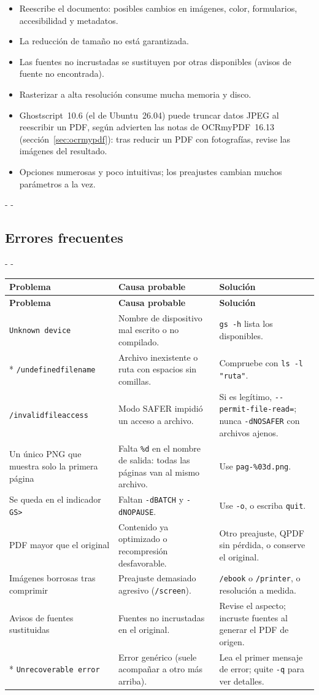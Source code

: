 \documentclass[11pt,a4paper]{article}
\makeatletter
\newcommand{\necesitaespacio}[1]{\par\penalty-100\begingroup
	\setlength{\dimen@}{#1}\dimen@ii\pagegoal\advance\dimen@ii-\pagetotal
	\ifdim\dimen@>\dimen@ii\ifdim\dimen@ii>\z@\vfil\fi\penalty-\@M\fi\endgroup}
\newenvironment{errores}{%
	\par\begingroup\small
	\begin{longtable}{L{4.1cm}L{4.9cm}L{6.0cm}}
		\toprule\rowcolor{tablacab}\cab{Problema} & \cab{Causa probable} & \cab{Solución} \\ \midrule
		\endfirsthead
		\toprule\rowcolor{tablacab}\cab{Problema} & \cab{Causa probable} & \cab{Solución} \\ \midrule
		\endhead
		\bottomrule
		\endfoot}
	{\end{longtable}\endgroup}
\newcommand{\cmd}[1]{\texttt{\textcolor{colcmd}{#1}}}      %
\newcommand{\opt}[1]{\texttt{\textcolor{colopt}{#1}}}      %
\newcommand{\arch}[1]{\texttt{\textcolor{colarch}{#1}}}    %
\newcommand{\val}[1]{\texttt{#1}}                          %
\newcommand{\cab}[1]{\textbf{#1}}
\makeatother
\begin{document}
	\begin{limitacion}
		\begin{itemize}
			\item Reescribe el documento: posibles cambios en imágenes, color, formularios, accesibilidad y metadatos.
			\item La reducción de tamaño no está garantizada.
			\item Las fuentes no incrustadas se sustituyen por otras disponibles (avisos de fuente no encontrada).
			\item Rasterizar a alta resolución consume mucha memoria y disco.
			\item Ghostscript~10.6 (el de Ubuntu~26.04) puede truncar datos JPEG al reescribir un PDF, según advierten las notas de OCRmyPDF~16.13 (sección~\ref{sec:ocrmypdf}): tras reducir un PDF con fotografías, revise las imágenes del resultado.
			\item Opciones numerosas y poco intuitivas; los preajustes cambian muchos parámetros a la vez.
		\end{itemize}
	\end{limitacion}
	
	\necesitaespacio{14\baselineskip}
	\subsection{Errores frecuentes}
	
	\necesitaespacio{10\baselineskip}
	\begin{errores}
		\texttt{Unknown device} & Nombre de dispositivo mal escrito o no compilado. & \cmd{gs -h} lista los disponibles.\\*
		\texttt{/\allowbreak{}undefinedfilename} & Archivo inexistente o ruta con espacios sin comillas. & Compruebe con \cmd{ls -l "ruta"}.\\
		\texttt{/\allowbreak{}invalidfileaccess} & Modo SAFER impidió un acceso a archivo. & Si es legítimo, \opt{-{}-permit-\allowbreak{}file-\allowbreak{}read=}; nunca \opt{-dNOSAFER} con archivos ajenos.\\
		Un único PNG que muestra solo la primera página & Falta \val{\%d} en el nombre de salida: todas las páginas van al mismo archivo. & Use \arch{pag-\%03d.png}.\\
		Se queda en el indicador \texttt{GS>} & Faltan \opt{-dBATCH} y \opt{-dNOPAUSE}. & Use \opt{-o}, o escriba \texttt{quit}.\\
		PDF mayor que el original & Contenido ya optimizado o recompresión desfavorable. & Otro preajuste, QPDF sin pérdida, o conserve el original.\\
		Imágenes borrosas tras comprimir & Preajuste demasiado agresivo (\val{/screen}). & \val{/ebook} o \val{/printer}, o resolución a medida.\\
		Avisos de fuentes sustituidas & Fuentes no incrustadas en el original. & Revise el aspecto; incruste fuentes al generar el PDF de origen.\\*
		\texttt{Unrecoverable error} & Error genérico (suele acompañar a otro más arriba). & Lea el primer mensaje de error; quite \opt{-q} para ver detalles.\\
	\end{errores}
	
\end{document}
